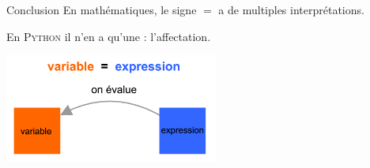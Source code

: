 \documentclass[10pt]{beamer}
\begin{document}
\begin{frame}{Conclusion}
En mathématiques, le signe $=$ a de multiples interprétations.\\\pause

En \textsc{Python} il n'en a qu'une : l'affectation.\pause

\begin{center}
\includegraphics[width=7cm]{img/affectation}
\end{center}
\end{frame}
\end{document}
